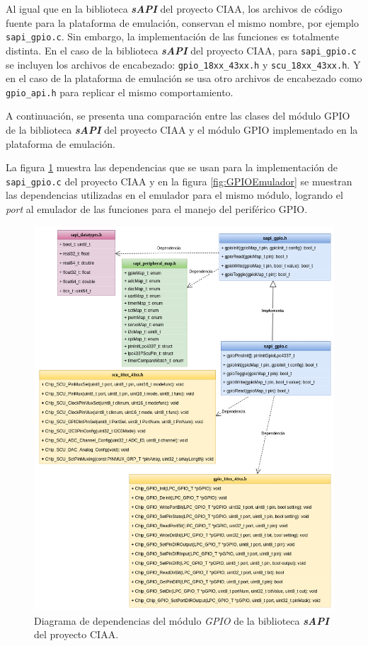 Al igual que en la biblioteca \textit{\textbf{sAPI}} del proyecto CIAA, los archivos de código fuente para la plataforma de emulación, conservan el mismo nombre, por ejemplo  \texttt{sapi\_gpio.c}. Sin embargo, la implementación de las funciones es totalmente distinta. En el caso de la biblioteca \textit{\textbf{sAPI}} del proyecto CIAA, para \texttt{sapi\_gpio.c}  se incluyen los archivos de encabezado: \texttt{gpio\_18xx\_43xx.h} y \newline \texttt{scu\_18xx\_43xx.h}. Y en el caso de la plataforma de emulación se usa otro archivos de encabezado como \texttt{gpio\_api.h} para replicar el mismo comportamiento.

A continuación, se presenta una comparación entre las clases del módulo GPIO de la biblioteca \textit{\textbf{sAPI}} del proyecto CIAA y el módulo GPIO implementado en la plataforma de emulación. 

La figura \ref{fig:GPIOsAPI} muestra las dependencias que se usan para la implementación de \newline \texttt{sapi\_gpio.c} del proyecto CIAA y en la figura \ref{fig:GPIOEmulador} se muestran las dependencias utilizadas en el emulador para el mismo módulo, logrando el \textit{port} al emulador de las funciones para el manejo del periférico GPIO.

\begin{figure}[ht]
	\centering
	\includegraphics[scale=.41]{./Figures/DiagramaClasesGPIOsAPI.png}
	\caption{Diagrama de dependencias del módulo \textit{GPIO} de la biblioteca \textit{\textbf{sAPI}} del proyecto CIAA.}
	\label{fig:GPIOsAPI}
\end{figure}

